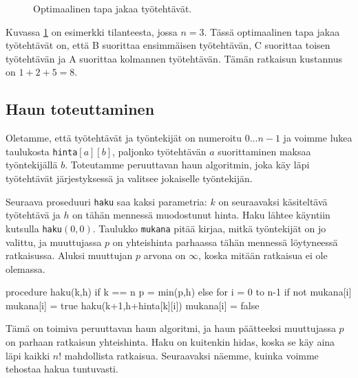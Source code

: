 \begin{figure}
\center
{}
\caption{Optimaalinen tapa jakaa työtehtävät.}
\label{fig:tyoteh}
\end{figure}

Kuvassa \ref{fig:tyoteh} on esimerkki tilanteesta, jossa $n=3$.
Tässä optimaalinen tapa jakaa työtehtävät on,
että B suorittaa ensimmäisen työtehtävän,
C suorittaa toisen työtehtävän ja
A suorittaa kolmannen työtehtävän.
Tämän ratkaisun kustannus on $1+2+5=8$.

\subsection{Haun toteuttaminen}

Oletamme, että työtehtävät ja työntekijät on numeroitu
$0 \dots n-1$ ja voimme lukea taulukosta \texttt{hinta}$[a][b]$,
paljonko työtehtävän $a$ suorittaminen maksaa
työntekijällä $b$.
Toteutamme peruuttavan haun algoritmin,
joka käy läpi työtehtävät järjestyksessä
ja valitsee jokaiselle työntekijän.

Seuraava proseduuri \texttt{haku} saa kaksi parametria:
$k$ on seuraavaksi käsitel\-tävä työtehtävä ja
$h$ on tähän mennessä muodostunut hinta.
Haku lähtee käyntiin kutsulla \texttt{haku}$(0,0)$.
Taulukko \texttt{mukana} pitää kirjaa,
mitkä työntekijät on jo valittu,
ja muuttujassa $p$ on yhteishinta
parhaassa tähän mennessä löytyneessä ratkaisussa.
Aluksi muuttujan $p$ arvona on $\infty$,
koska mitään ratkaisua ei ole olemassa.

\begin{code}
procedure haku(k,h)
    if k == n
        p = min(p,h)
    else
        for i = 0 to n-1
            if not mukana[i]
                mukana[i] = true
                haku(k+1,h+hinta[k][i])
                mukana[i] = false
\end{code}

Tämä on toimiva peruuttavan haun algoritmi,
ja haun päätteeksi muuttujassa $p$ on
parhaan ratkaisun yhteishinta.
Haku on kuitenkin hidas, koska se käy aina läpi
kaikki $n!$ mahdollista ratkaisua.
Seuraavaksi näemme, kuinka voimme tehostaa hakua tuntuvasti.

